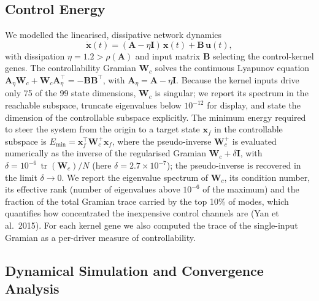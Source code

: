 \documentclass[12pt]{article}
\begin{document}
\subsection{Control Energy}

We modelled the linearised, dissipative network dynamics
\begin{equation}
\dot{\mathbf{x}}(t) = (\mathbf{A} - \eta \mathbf{I})\,\mathbf{x}(t)
+ \mathbf{B}\,\mathbf{u}(t),
\end{equation}
with dissipation $\eta = 1.2 > \rho(\mathbf{A})$ and input matrix
$\mathbf{B}$ selecting the control-kernel genes. The controllability Gramian
$\mathbf{W}_c$ solves the continuous Lyapunov equation
$\mathbf{A}_\eta \mathbf{W}_c + \mathbf{W}_c\mathbf{A}_\eta^\top =
-\mathbf{B}\mathbf{B}^\top$, with $\mathbf{A}_\eta = \mathbf{A} - \eta
\mathbf{I}$. Because the kernel inputs drive only 75 of the 99 state
dimensions, $\mathbf{W}_c$ is singular; we report its spectrum in the
reachable subspace, truncate eigenvalues below $10^{-12}$ for display, and
state the dimension of the controllable subspace explicitly. The minimum
energy required to steer the system from the origin to a target state
$\mathbf{x}_f$ in the controllable subspace is $E_{\min} =
\mathbf{x}_f^\top \mathbf{W}_c^{+}\mathbf{x}_f$, where the pseudo-inverse
$\mathbf{W}_c^{+}$ is evaluated numerically as the inverse of the
regularised Gramian $\mathbf{W}_c + \delta\mathbf{I}$, with $\delta =
10^{-6}\,\operatorname{tr}(\mathbf{W}_c)/N$ (here $\delta =
2.7\times10^{-7}$); the pseudo-inverse is recovered in the limit
$\delta\to 0$. We report the eigenvalue spectrum of $\mathbf{W}_c$, its
condition number, its effective rank (number of eigenvalues above $10^{-6}$
of the maximum) and the fraction of the total Gramian trace carried by the
top 10\% of modes, which quantifies how concentrated the inexpensive control
channels are (Yan et al.\ 2015). For each kernel gene we also computed the
trace of the single-input Gramian as a per-driver measure of
controllability.

\subsection{Dynamical Simulation and Convergence Analysis}
\end{document}
